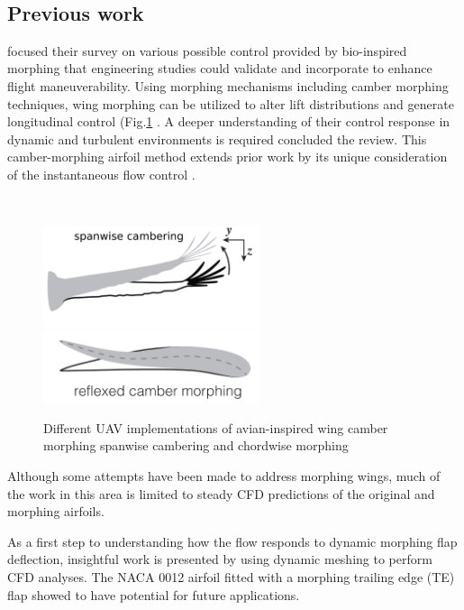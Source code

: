 \\
\subsection{Previous work}

\citet{Harvey2022AControl} focused their survey on various possible control provided by bio-inspired morphing that engineering studies could validate and incorporate to enhance flight maneuverability. Using morphing mechanisms including camber morphing techniques, wing morphing can be utilized to alter lift distributions and generate longitudinal control (Fig.\ref{fig:camberMorphing} . A deeper understanding of their control response in dynamic and turbulent environments is required concluded the review.
This camber-morphing airfoil method extends prior work by its unique consideration of the instantaneous flow control \citet{Gamble2020a,Gamble2020b}.

\\

\begin{figure}[hbt!]
  \centering
\includegraphics[width=2.5in]{Figures/span morphing.png}
\includegraphics[width=2.5in]{Figures/camber morphing.png}
  
  \caption{\label{fig:camberMorphing} Different UAV implementations of avian-inspired wing camber morphing spanwise cambering and chordwise morphing \cite{Harvey2022AControl} }
\end{figure}



Although some attempts have been made to address morphing wings, much of the work in this area is limited to steady CFD predictions of the original and morphing airfoils.

As a first step to understanding how the flow responds to dynamic morphing flap deflection,  insightful work is presented by \cite{Abdessemed2018MorphingMeshing} using dynamic meshing to perform CFD analyses. The NACA 0012 airfoil fitted with a morphing trailing edge (TE) flap showed to have potential for future applications. 

